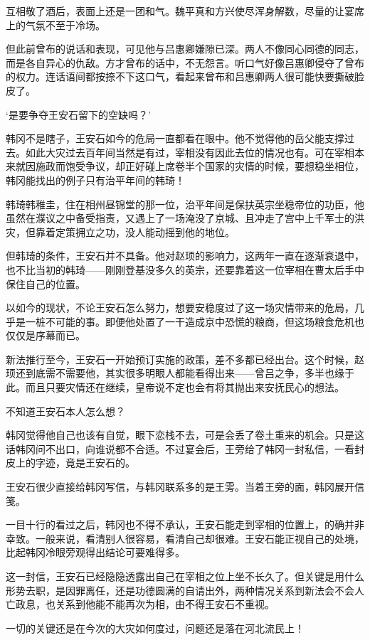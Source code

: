互相敬了酒后，表面上还是一团和气。魏平真和方兴使尽浑身解数，尽量的让宴席上的气氛不至于冷场。

但此前曾布的说话和表现，可见他与吕惠卿嫌隙已深。两人不像同心同德的同志，而是各自异心的仇敌。方才曾布的话中，不无怨言。听口气好像吕惠卿侵夺了曾布的权力。连话语间都按捺不下这口气，看起来曾布和吕惠卿两人很可能快要撕破脸皮了。

‘是要争夺王安石留下的空缺吗？’

韩冈不是瞎子，王安石如今的危局一直都看在眼中。他不觉得他的岳父能支撑过去。如此大灾过去百年间当然是有过，宰相没有因此去位的情况也有。可在宰相本来就因施政而饱受争议，却正好碰上席卷半个国家的灾情的时候，要想稳坐相位，韩冈能找出的例子只有治平年间的韩琦！

韩琦韩稚圭，住在相州昼锦堂的那一位，治平年间是保扶英宗坐稳帝位的功臣，他虽然在濮议之中备受指责，又遇上了一场淹没了京城、且冲走了宫中上千军士的洪灾，但靠着定策拥立之功，没人能动摇到他的地位。

但韩琦的条件，王安石并不具备。他对赵顼的影响力，这两年一直在逐渐衰退中，也不比当初的韩琦——刚刚登基没多久的英宗，还要靠着这一位宰相在曹太后手中保住自己的位置。

以如今的现状，不论王安石怎么努力，想要安稳度过了这一场灾情带来的危局，几乎是一桩不可能的事。即便他处置了一干造成京中恐慌的粮商，但这场粮食危机也仅仅是序幕而已。

新法推行至今，王安石一开始预订实施的政策，差不多都已经出台。这个时候，赵顼还到底需不需要他，其实很多明眼人都能看得出来——曾吕之争，多半也缘于此。而且只要灾情还在继续，皇帝说不定也会有将其抛出来安抚民心的想法。

不知道王安石本人怎么想？

韩冈觉得他自己也该有自觉，眼下恋栈不去，可是会丢了卷土重来的机会。只是这话韩冈问不出口，向谁说都不合适。不过宴会后，王旁给了韩冈一封私信，一看封皮上的字迹，竟是王安石的。

王安石很少直接给韩冈写信，与韩冈联系多的是王雱。当着王旁的面，韩冈展开信笺。

一目十行的看过之后，韩冈也不得不承认，王安石能走到宰相的位置上，的确并非幸致。一般来说，看清别人很容易，看清自己却很难。王安石能正视自己的处境，比起韩冈冷眼旁观得出结论可要难得多。

这一封信，王安石已经隐隐透露出自己在宰相之位上坐不长久了。但关键是用什么形势去职，是因罪离任，还是功德圆满的自请出外，两种情况关系到新法会不会人亡政息，也关系到他能不能再次为相，由不得王安石不重视。

一切的关键还是在今次的大灾如何度过，问题还是落在河北流民上！

